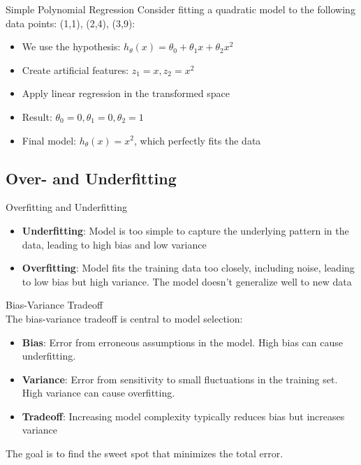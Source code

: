 \begin{example}{Simple Polynomial Regression}
Consider fitting a quadratic model to the following data points: (1,1), (2,4), (3,9):
\begin{itemize}
    \item We use the hypothesis: $h_\theta(x) = \theta_0 + \theta_1 x + \theta_2 x^2$
    \item Create artificial features: $z_1 = x, z_2 = x^2$
    \item Apply linear regression in the transformed space
    \item Result: $\theta_0 = 0, \theta_1 = 0, \theta_2 = 1$
    \item Final model: $h_\theta(x) = x^2$, which perfectly fits the data
\end{itemize}
\end{example}

\subsection{Over- and Underfitting}

\begin{definition}{Overfitting and Underfitting}\\
\begin{itemize}
    \item \textbf{Underfitting}: Model is too simple to capture the underlying pattern in the data, leading to high bias and low variance
    \item \textbf{Overfitting}: Model fits the training data too closely, including noise, leading to low bias but high variance. The model doesn't generalize well to new data
\end{itemize}
\end{definition}

\begin{concept}{Bias-Variance Tradeoff}\\
The bias-variance tradeoff is central to model selection:
\begin{itemize}
    \item \textbf{Bias}: Error from erroneous assumptions in the model. High bias can cause underfitting.
    \item \textbf{Variance}: Error from sensitivity to small fluctuations in the training set. High variance can cause overfitting.
    \item \textbf{Tradeoff}: Increasing model complexity typically reduces bias but increases variance
\end{itemize}
The goal is to find the sweet spot that minimizes the total error.
\end{concept}

